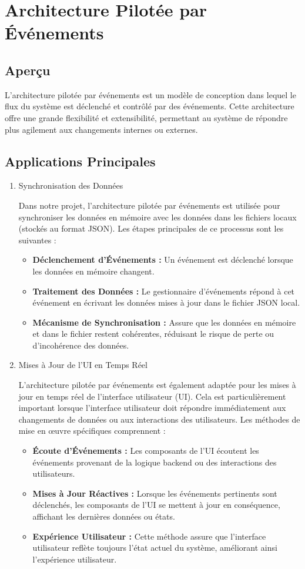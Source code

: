 \documentclass{article}
\begin{document}
\section{Architecture Pilotée par Événements}
\subsection{Aperçu}
L'architecture pilotée par événements est un modèle de conception dans lequel le flux du système est déclenché et contrôlé par des événements. Cette architecture offre une grande flexibilité et extensibilité, permettant au système de répondre plus agilement aux changements internes ou externes.
\subsection{Applications Principales}
\begin{enumerate}
    \item Synchronisation des Données
    
    Dans notre projet, l'architecture pilotée par événements est utilisée pour synchroniser les données en mémoire avec les données dans les fichiers locaux (stockés au format JSON). Les étapes principales de ce processus sont les suivantes :
    \begin{itemize}
        \item \textbf{Déclenchement d'Événements :} Un événement est déclenché lorsque les données en mémoire changent.
        \item \textbf{Traitement des Données :} Le gestionnaire d'événements répond à cet événement en écrivant les données mises à jour dans le fichier JSON local.
        \item \textbf{Mécanisme de Synchronisation :} Assure que les données en mémoire et dans le fichier restent cohérentes, réduisant le risque de perte ou d'incohérence des données.
    \end{itemize}
    \item Mises à Jour de l'UI en Temps Réel

    L'architecture pilotée par événements est également adaptée pour les mises à jour en temps réel de l'interface utilisateur (UI). Cela est particulièrement important lorsque l'interface utilisateur doit répondre immédiatement aux changements de données ou aux interactions des utilisateurs. Les méthodes de mise en œuvre spécifiques comprennent :
    \begin{itemize}
        \item \textbf{Écoute d'Événements :} Les composants de l'UI écoutent les événements provenant de la logique backend ou des interactions des utilisateurs.
        \item \textbf{Mises à Jour Réactives :} Lorsque les événements pertinents sont déclenchés, les composants de l'UI se mettent à jour en conséquence, affichant les dernières données ou états.
        \item \textbf{Expérience Utilisateur :} Cette méthode assure que l'interface utilisateur reflète toujours l'état actuel du système, améliorant ainsi l'expérience utilisateur.
    \end{itemize}
\end{enumerate}
\end{document}
